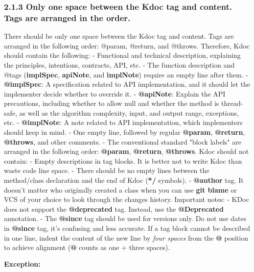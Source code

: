 \subsubsection*{\textbf{2.1.3 Only one space between the Kdoc tag and content. Tags are arranged in the order.}}
\leavevmode\newline
\label{sec:2.1.3}
There should be only one space between the Kdoc tag and content. Tags are arranged in the following order: @param, @return, and @throws.
Therefore, Kdoc should contain the following:
- Functional and technical description, explaining the principles, intentions, contracts, API, etc.
- The function description and @tags (\textbf{implSpec}, \textbf{apiNote}, and \textbf{implNote}) require an empty line after them.
- \textbf{@implSpec}: A specification related to API implementation, and it should let the implementer decide whether to override it.
- \textbf{@apiNote}: Explain the API precautions, including whether to allow null and whether the method is thread-safe, as well as the algorithm complexity, input, and output range, exceptions, etc.
- \textbf{@implNote}: A note related to API implementation, which implementers should keep in mind.
- One empty line, followed by regular \textbf{@param}, \textbf{@return}, \textbf{@throws}, and other comments.
- The conventional standard "block labels" are arranged in the following order: \textbf{@param}, \textbf{@return}, \textbf{@throws}.
Kdoc should not contain:
- Empty descriptions in tag blocks. It is better not to write Kdoc than waste code line space.
- There should be no empty lines between the method/class declaration and the end of Kdoc (\textbf{*/} symbols).
- \textbf{@author} tag. It doesn't matter who originally created a class when you can use \textbf{git blame} or VCS of your choice to look through the changes history.
Important notes:
- KDoc does not support the \textbf{@deprecated} tag. Instead, use the \textbf{@Deprecated} annotation.
- The \textbf{@since} tag should be used for versions only. Do not use dates in \textbf{@since} tag, it's confusing and less accurate.
If a tag block cannot be described in one line, indent the content of the new line by \textit{four spaces} from the \textbf{@} position to achieve alignment (\textbf{@} counts as one + three spaces).
 
\textbf{Exception:}
 

